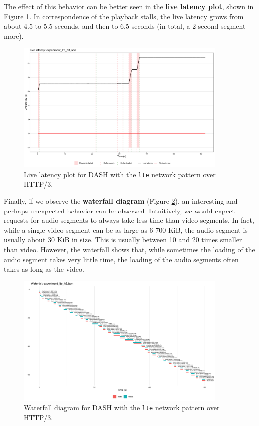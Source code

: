 The effect of this behavior can be better seen in the \textbf{live latency plot}, shown in Figure \ref{fig:eval_nonabr_lte_h3_latency}. In correspondence of the playback stalls, the live latency grows from about 4.5 to 5.5 seconds, and then to 6.5 seconds (in total, a 2-second segment more).

\begin{figure}[h]
    \centering
    \includegraphics[width=0.9\textwidth]{res/eval_nonabr_lte_h3_latency.png}
    \caption{Live latency plot for DASH with the \texttt{lte} network pattern over HTTP/3.}
    \label{fig:eval_nonabr_lte_h3_latency}
\end{figure}

Finally, if we observe the \textbf{waterfall diagram} (Figure \ref{fig:eval_nonabr_lte_h3_waterfall}), an interesting and perhaps unexpected behavior can be observed. Intuitively, we would expect requests for audio segments to always take less time than video segments. In fact, while a single video segment can be as large as 6-700 KiB, the audio segment is usually about 30 KiB in size. This is usually between 10 and 20 times smaller than video. However, the waterfall shows that, while sometimes the loading of the audio segment takes very little time, the loading of the audio segments often takes as long as the video.

\begin{figure}[h]
    \centering
    \includegraphics[width=0.9\textwidth]{res/eval_nonabr_lte_h3_waterfall.png}
    \caption{Waterfall diagram for DASH with the \texttt{lte} network pattern over HTTP/3.}
    \label{fig:eval_nonabr_lte_h3_waterfall}
\end{figure}

